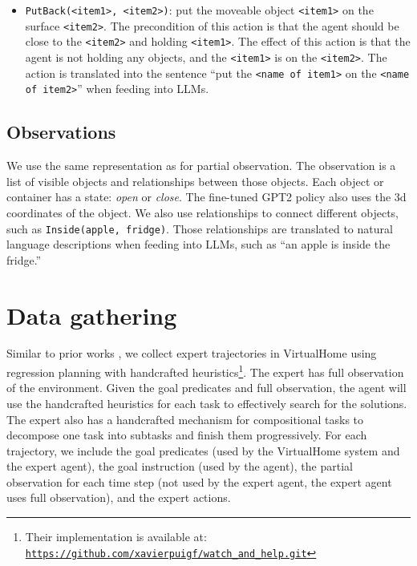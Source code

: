 \begin{itemize}
    \item \texttt{PutBack(<item1>, <item2>)}: put the moveable object \texttt{<item1>} on the surface \texttt{<item2>}. The precondition of this action is that the agent should be close to the \texttt{<item2>} and holding \texttt{<item1>}. The effect of this action is that the agent is not holding any objects, and the \texttt{<item1>} is on the \texttt{<item2>}. The action is translated into the sentence ``put the \texttt{<name of item1>} on the \texttt{<name of item2>}'' when feeding into LLMs.
\end{itemize}

\subsection{Observations} We use the same representation as \cite{li2022pre} for partial observation. The observation is a list of visible objects and relationships between those objects. Each object or container has a state: \textit{open} or \textit{close}. The fine-tuned GPT2 policy \cite{li2022pre} also uses the 3d coordinates of the object. We also use relationships to connect different objects, such as \texttt{Inside(apple, fridge)}. Those relationships are translated to natural language descriptions when feeding into LLMs, such as ``an apple is inside the fridge.''


\section{Data gathering}

Similar to prior works \cite{puig2020watch, li2022pre}, we collect expert trajectories in VirtualHome using regression planning with handcrafted heuristics\footnote{Their implementation is available at: \href{https://github.com/xavierpuigf/watch_and_help.git}{\texttt{https://github.com/xavierpuigf/watch\_and\_help.git}}}. 
The expert has full observation of the environment. Given the goal predicates and full observation, the agent will use the handcrafted heuristics for each task to effectively search for the solutions. The expert also has a handcrafted mechanism for compositional tasks to decompose one task into subtasks and finish them progressively. For each trajectory, we include the goal predicates (used by the VirtualHome system and the expert agent), the goal instruction (used by the agent), the partial observation for each time step (not used by the expert agent, the expert agent uses full observation), and the expert actions. 

